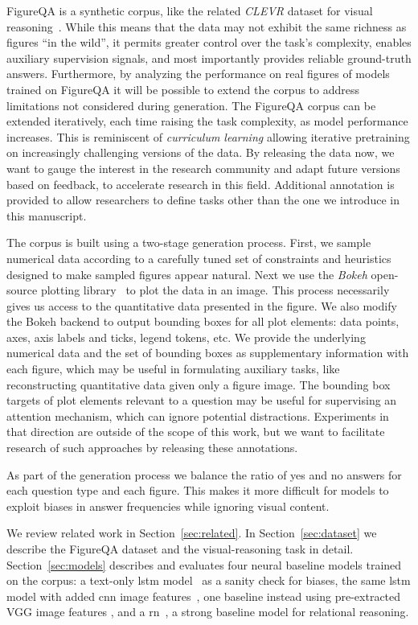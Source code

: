 \documentclass{article} \usepackage{iclr2018_workshop,times}
\begin{document}
FigureQA is a synthetic corpus, like the related \emph{CLEVR} dataset for visual reasoning~\citep{johnson2016clevr}.
While this means that the data may not exhibit the same richness as figures ``in the wild'',  it permits greater control over the task's complexity, enables auxiliary supervision signals, and most importantly provides reliable ground-truth answers. Furthermore, by analyzing the performance on real figures of models trained on FigureQA it will be possible to extend the corpus to address limitations not considered during generation.
The FigureQA corpus can be extended iteratively, each time raising the task complexity, as model performance increases. This is reminiscent of \emph{curriculum learning} \citep{bengio2009curriculum} allowing iterative pretraining on increasingly challenging versions of the data. By releasing the data now, we want to gauge the interest in the research community and adapt future versions based on feedback, to accelerate research in this field.
Additional annotation is provided to allow researchers to define tasks other than the one we introduce in this manuscript.

The corpus is built using a two-stage generation process. First, we sample numerical data according to a carefully tuned set of constraints and heuristics designed to make sampled figures appear natural.
Next we use the \emph{Bokeh} open-source plotting library~\citep{bokeh} to plot the data in an image. This process necessarily gives us access to the quantitative data presented in the figure. We also modify the Bokeh backend to output bounding boxes for all plot elements: data points, axes, axis labels and ticks, legend tokens, etc. We provide the underlying numerical data and the set of bounding boxes as supplementary information with each figure, which may be useful in formulating auxiliary tasks, like reconstructing quantitative data given only a figure image. The bounding box targets of plot elements relevant to a question may be useful for supervising an attention mechanism, which can ignore potential distractions. Experiments in that direction are outside of the scope of this work, but we want to facilitate research of such approaches by releasing these annotations.

As part of the generation process we balance the ratio of yes and no answers for each question type and each figure. 
This makes it more difficult for models to exploit biases in answer frequencies while ignoring visual content.

We review related work in Section~\ref{sec:related}.
In Section~\ref{sec:dataset} we describe the FigureQA dataset and the visual-reasoning task in detail. Section~\ref{sec:models} describes and evaluates four neural baseline models trained on the corpus: a text-only \gls{lstm} model~\citep{hochreiter1997long} as a sanity check for biases, the same \gls{lstm} model with added \gls{cnn} image features~\citep{lecun1998gradient,fukushima1988neocognitron}, one baseline instead using pre-extracted VGG image features \citep{simonyan2014very}, and a \gls{rn}~\citep{santoro2017simple}, a strong baseline model for relational reasoning. 
\end{document}

